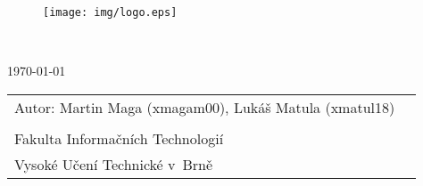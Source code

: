 \begin{titlepage}

\begin{figure}[!h]
  \centering
  \texttt{[image: img/logo.eps]}
\end{figure}

\vfill

\begin{center}
\begin{Large}

\end{Large}
\bigskip
\begin{Huge}
\projname\\
\end{Huge}
\begin{large}

\end{large}
\end{center}

\vfill

\begin{center}
\begin{Large}
\today
\end{Large}
\end{center}

\vfill

\begin{flushleft}
\begin{large}
\begin{tabular}{ll}
Autor: Martin Maga (xmagam00), Lukáš Matula (xmatul18) \\ \\
  Fakulta Informačních Technologií \\
  Vysoké Učení Technické v~Brně \\
\end{tabular}
\end{large}
\end{flushleft}
\end{titlepage}
